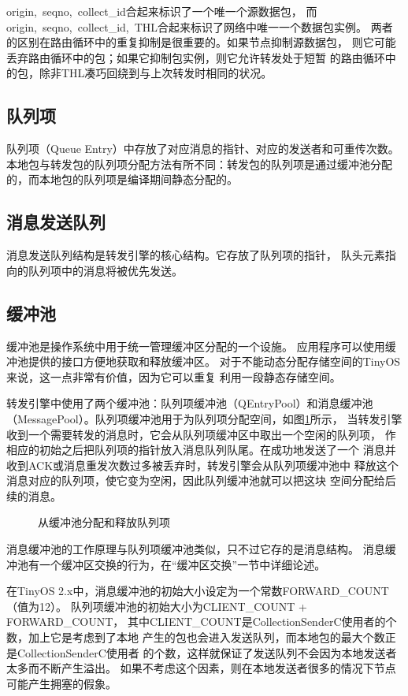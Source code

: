 origin,~seqno,~collect\_id合起来标识了一个唯一个源数据包，
而origin,~seqno,~collect\_id,~THL合起来标识了网络中唯一一个数据包实例。
两者的区别在路由循环中的重复抑制是很重要的。如果节点抑制源数据包，
则它可能丢弃路由循环中的包；如果它抑制包实例，则它允许转发处于短暂
的路由循环中的包，除非THL凑巧回绕到与上次转发时相同的状况。

\subsection{队列项}
队列项（Queue Entry）中存放了对应消息的指针、对应的发送者和可重传次数。本地包与转发包的队列项分配方法有所不同：转发包的队列项是通过缓冲池分配的，而本地包的队列项是编译期间静态分配的。

\subsection{消息发送队列}
消息发送队列结构是转发引擎的核心结构。它存放了队列项的指针，
队头元素指向的队列项中的消息将被优先发送。

\subsection{缓冲池}
缓冲池是操作系统中用于统一管理缓冲区分配的一个设施。
应用程序可以使用缓冲池提供的接口方便地获取和释放缓冲区。
对于不能动态分配存储空间的TinyOS来说，这一点非常有价值，因为它可以重复
利用一段静态存储空间。

转发引擎中使用了两个缓冲池：队列项缓冲池（QEntryPool）和消息缓冲池
（MessagePool）。队列项缓冲池用于为队列项分配空间，如图\ref{qe-buffer-pool}所示，
当转发引擎收到一个需要转发的消息时，它会从队列项缓冲区中取出一个空闲的队列项，
作相应的初始之后把队列项的指针放入消息队列队尾。在成功地发送了一个
消息并收到ACK或消息重发次数过多被丢弃时，转发引擎会从队列项缓冲池中
释放这个消息对应的队列项，使它变为空闲，因此队列缓冲池就可以把这块
空间分配给后续的消息。

\begin{figure}[ht]
\centering

\caption{从缓冲池分配和释放队列项}\label{qe-buffer-pool}
\end{figure}

消息缓冲池的工作原理与队列项缓冲池类似，只不过它存的是消息结构。
消息缓冲池有一个缓冲区交换的行为，在“缓冲区交换”一节中详细论述。

在TinyOS 2.x中，消息缓冲池的初始大小设定为一个常数FORWARD\_COUNT（值为12）。
队列项缓冲池的初始大小为CLIENT\_COUNT + FORWARD\_COUNT，
其中CLIENT\_COUNT是CollectionSenderC使用者的个数，加上它是考虑到了本地
产生的包也会进入发送队列，而本地包的最大个数正是CollectionSenderC使用者
的个数，这样就保证了发送队列不会因为本地发送者太多而不断产生溢出。
如果不考虑这个因素，则在本地发送者很多的情况下节点可能产生拥塞的假象。


